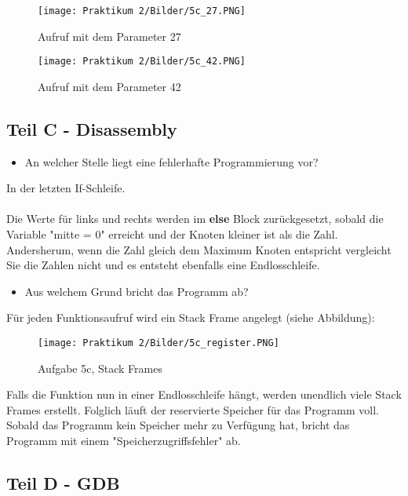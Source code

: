 \documentclass[12pt]{article}
\begin{document}
\begin{figure}[!ht]
    \centering
    \texttt{[image: Praktikum 2/Bilder/5c\_27.PNG]}
    \caption{Aufruf mit dem Parameter 27}
\end{figure}

\begin{figure}[!ht]
    \centering
    \texttt{[image: Praktikum 2/Bilder/5c\_42.PNG]}
    \caption{Aufruf mit dem Parameter 42}
\end{figure}
\newpage

\subsection{Teil C - Disassembly}

\begin{itemize}
  \item An welcher Stelle liegt eine fehlerhafte Programmierung vor?
\end{itemize}

In der letzten If-Schleife.\\\\
Die Werte für links und rechts werden im \textbf{else} Block zurückgesetzt, sobald die Variable "mitte = 0" erreicht und der Knoten kleiner ist als die Zahl. Andersherum, wenn die Zahl gleich dem Maximum Knoten entspricht vergleicht Sie die Zahlen nicht und es entsteht ebenfalls eine Endlosschleife.

\begin{itemize}
  \item Aus welchem Grund bricht das Programm ab?
\end{itemize}

Für jeden Funktionsaufruf wird ein Stack Frame angelegt (siehe Abbildung):

\begin{figure}[htbp]
    \centering
    \texttt{[image: Praktikum 2/Bilder/5c\_register.PNG]}
     \caption{Aufgabe 5c, Stack Frames}
\end{figure}

 Falls die Funktion nun in einer Endlosschleife hängt, werden unendlich viele Stack Frames erstellt. Folglich läuft der reservierte Speicher für das Programm voll. Sobald das Programm kein Speicher mehr zu Verfügung hat, bricht das Programm mit einem "Speicherzugriffsfehler" ab. 
\newpage

\subsection{Teil D - GDB}
\end{document}
